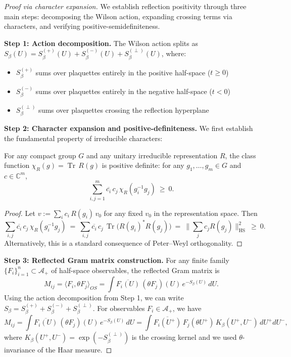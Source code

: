 \documentclass[11pt]{amsart}
\begin{document}
\begin{proof}[Proof via character expansion]
We establish reflection positivity through three main steps: decomposing the Wilson action, expanding crossing terms via characters, and verifying positive-semidefiniteness.

\textbf{Step 1: Action decomposition.} 
The Wilson action splits as $S_\beta(U) = S_\beta^{(+)}(U) + S_\beta^{(-)}(U) + S_\beta^{(\perp)}(U)$, where:
\begin{itemize}
  \item $S_\beta^{(+)}$ sums over plaquettes entirely in the positive half-space ($t \ge 0$)
  \item $S_\beta^{(-)}$ sums over plaquettes entirely in the negative half-space ($t < 0$)
  \item $S_\beta^{(\perp)}$ sums over plaquettes crossing the reflection hyperplane
\end{itemize}

\textbf{Step 2: Character expansion and positive-definiteness.}
We first establish the fundamental property of irreducible characters:

\begin{lemma}\label{lem:char-pd}
For any compact group $G$ and any unitary irreducible representation $R$, the class function $\chi_R(g)=\operatorname{Tr}\,R(g)$ is positive definite: for any $g_1,\dots,g_m\in G$ and $c\in\mathbb C^m$,
\[
  \sum_{i,j=1}^m \overline{c_i}\,c_j\,\chi_R(g_i^{-1} g_j)\ \ge\ 0.
\]
\end{lemma}
\begin{proof}
Let $v:=\sum_i c_i\,R(g_i)\,v_0$ for any fixed $v_0$ in the representation space. Then
\[
  \sum_{i,j}\overline{c_i}\,c_j\,\chi_R(g_i^{-1} g_j)\ =\ \sum_{i,j}\overline{c_i}\,c_j\,\operatorname{Tr}\big(R(g_i)^{*}R(g_j)\big)\ =\ \|\sum_j c_j R(g_j)\|_{\mathrm{HS}}^2\ \ge\ 0.
\]
Alternatively, this is a standard consequence of Peter–Weyl orthogonality.
\end{proof}

\textbf{Step 3: Reflected Gram matrix construction.}
For any finite family $\{F_i\}_{i=1}^n \subset \mathcal{A}_+$ of half-space observables, the reflected Gram matrix is
\[
  M_{ij} = \langle F_i, \theta F_j \rangle_{OS} = \int \overline{F_i(U)} \, (\theta F_j)(U) \, e^{-S_\beta(U)} \, dU.
\]
Using the action decomposition from Step 1, we can write $S_\beta = S_\beta^{(+)} + S_\beta^{(-)} + S_\beta^{(\perp)}$. For observables $F_i \in \mathcal{A}_+$, we have
\[
  M_{ij} = \int \overline{F_i(U)} \, (\theta F_j)(U) \, e^{-S_\beta(U)} \, dU = \int \overline{F_i(U^+)} \, F_j(\theta U^+) \, K_\beta(U^+, U^-) \, dU^+ dU^-,
\]
where $K_\beta(U^+, U^-) = \exp(-S_\beta^{(\perp)})$ is the crossing kernel and we used $\theta$-invariance of the Haar measure.


\end{proof}
\end{document}
